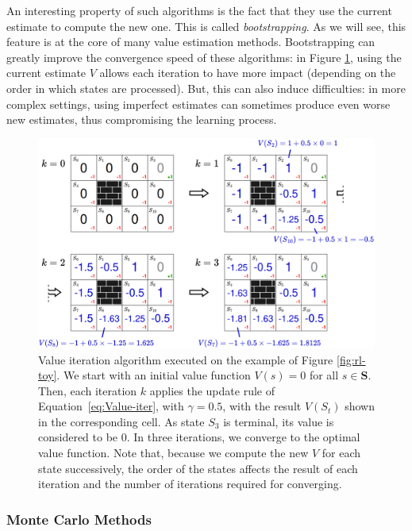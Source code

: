An interesting property of such algorithms is the fact that they use the current estimate to compute the new one. This is called \textit{bootstrapping}. As we will see, this feature is at the core of many value estimation methods. Bootstrapping can greatly improve the convergence speed of these algorithms: in Figure \ref{fig:value-iter}, using the current estimate $V$ allows each iteration to have more impact (depending on the order in which states are processed). But, this can also induce difficulties: in more complex settings, using imperfect estimates can sometimes produce even worse new estimates, thus compromising the learning process. 

\begin{figure}
    \centering
    \includegraphics[width=1\linewidth]{Figures/RL/value-iter.png}
    \caption{Value iteration algorithm executed on the example of Figure \ref{fig:rl-toy}. We start with an initial value function $V(s)=0$ for all $s\in\mathbf{S}$. Then, each iteration $k$ applies the update rule of Equation~\ref{eq:Value-iter}, with $\gamma=0.5$, with the result $V(S_t)$ shown in the corresponding cell. As state $S_3$ is terminal, its value is considered to be 0. In three iterations, we converge to the optimal value function. Note that, because we compute the new $V$ for each state successively, the order of the states affects the result of each iteration and the number of iterations required for converging.}
    \label{fig:value-iter}
\end{figure}

\subsubsection{Monte Carlo Methods}\label{sec:RL:MonteCarlo}

